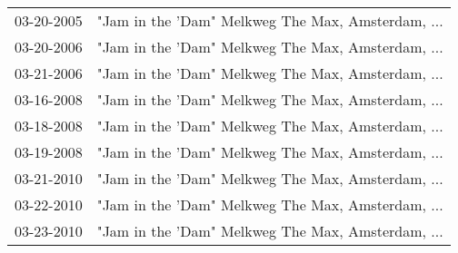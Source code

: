 \begin{supertabular}{ll}
 03-20-2005 &  "Jam in the 'Dam" Melkweg The Max, Amsterdam, ... \\
 03-20-2006 &  "Jam in the 'Dam" Melkweg The Max, Amsterdam, ... \\
 03-21-2006 &  "Jam in the 'Dam" Melkweg The Max, Amsterdam, ... \\
 03-16-2008 &  "Jam in the 'Dam" Melkweg The Max, Amsterdam, ... \\
 03-18-2008 &  "Jam in the 'Dam" Melkweg The Max, Amsterdam, ... \\
 03-19-2008 &  "Jam in the 'Dam" Melkweg The Max, Amsterdam, ... \\
 03-21-2010 &  "Jam in the 'Dam" Melkweg The Max, Amsterdam, ... \\
 03-22-2010 &  "Jam in the 'Dam" Melkweg The Max, Amsterdam, ... \\
 03-23-2010 &  "Jam in the 'Dam" Melkweg The Max, Amsterdam, ... \\
\end{supertabular}
